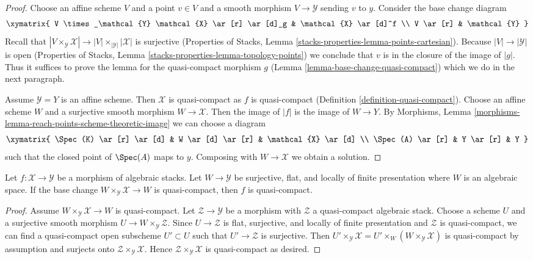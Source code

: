 \begin{proof}
Choose an affine scheme $V$ and a point $v \in V$ and a smooth morphism
$V \to \mathcal{Y}$ sending $v$ to $y$. Consider the base change diagram
$$
\xymatrix{
V \times_\mathcal{Y} \mathcal{X} \ar[r] \ar[d]_g & \mathcal{X} \ar[d]^f \\
V \ar[r] & \mathcal{Y}
}
$$
Recall that $|V \times_\mathcal{Y} \mathcal{X}| \to
|V| \times_{|\mathcal{Y}|} |\mathcal{X}|$ is surjective
(Properties of Stacks, Lemma \ref{stacks-properties-lemma-points-cartesian}).
Because $|V| \to |\mathcal{Y}|$ is open
(Properties of Stacks, Lemma \ref{stacks-properties-lemma-topology-points})
we conclude that $v$ is in the closure of the image of $|g|$.
Thus it suffices to prove the lemma for the quasi-compact morphism $g$
(Lemma \ref{lemma-base-change-quasi-compact}) which we do in the next
paragraph.

\medskip\noindent
Assume $\mathcal{Y} = Y$ is an affine scheme. Then $\mathcal{X}$
is quasi-compact as $f$ is quasi-compact
(Definition \ref{definition-quasi-compact}).
Choose an affine scheme $W$ and a surjective smooth morphism
$W \to \mathcal{X}$. Then the image of $|f|$ is the image
of $W \to Y$.
By Morphisms, Lemma \ref{morphisms-lemma-reach-points-scheme-theoretic-image}
we can choose a diagram
$$
\xymatrix{
\Spec(K) \ar[r] \ar[d] & W \ar[d] \ar[r] & \mathcal{X} \ar[d] \\
\Spec(A) \ar[r] & Y \ar[r] & Y
}
$$
such that the closed point of $\Spec(A)$ maps to $y$.
Composing with $W \to \mathcal{X}$ we obtain a solution.
\end{proof}

\begin{lemma}
\label{lemma-check-quasi-compact-covering}
Let $f : \mathcal{X} \to \mathcal{Y}$ be a morphism of algebraic stacks.
Let $W \to \mathcal{Y}$ be surjective, flat, and locally of finite
presentation where $W$ is an algebraic space. If the base change
$W \times_\mathcal{Y} \mathcal{X} \to W$ is quasi-compact, then
$f$ is quasi-compact.
\end{lemma}

\begin{proof}
Assume $W \times_\mathcal{Y} \mathcal{X} \to W$ is quasi-compact.
Let $\mathcal{Z} \to \mathcal{Y}$ be a morphism with $\mathcal{Z}$
a quasi-compact algebraic stack. Choose a scheme $U$ and a surjective
smooth morphism
$U \to W \times_\mathcal{Y} \mathcal{Z}$.
Since $U \to \mathcal{Z}$ is flat, surjective, and locally of finite
presentation and $\mathcal{Z}$ is quasi-compact, we can find a
quasi-compact open subscheme $U' \subset U$ such that
$U' \to \mathcal{Z}$ is surjective.
Then
$U' \times_\mathcal{Y} \mathcal{X} =
U' \times_W (W \times_\mathcal{Y} \mathcal{X})$
is quasi-compact by assumption and surjects onto
$\mathcal{Z} \times_\mathcal{Y} \mathcal{X}$.
Hence $\mathcal{Z} \times_\mathcal{Y} \mathcal{X}$
is quasi-compact as desired.
\end{proof}











